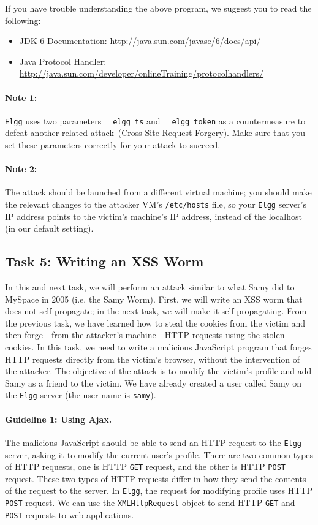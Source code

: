 If you have trouble understanding the above program, 
we suggest you to read the following:

\begin{itemize}
\item JDK 6 Documentation: \url{http://java.sun.com/javase/6/docs/api/}
\item Java Protocol Handler:\\ 
\url{http://java.sun.com/developer/onlineTraining/protocolhandlers/}
\end{itemize}

\paragraph{Note 1:} {\tt Elgg} uses two parameters {\tt \_\_elgg\_ts} and
{\tt \_\_elgg\_token} as a countermeasure to defeat another related 
attack~(Cross Site Request Forgery). Make sure that you set these 
parameters correctly for your attack to succeed.

\paragraph{Note 2:} The attack should be launched from a 
different virtual machine; you should make the relevant changes to the 
attacker VM's {\tt /etc/hosts} file, so your 
{\tt Elgg} server's IP address points to the victim's machine's IP address,
instead of the localhost (in our default setting).


\subsection{Task 5: Writing an XSS Worm}

In this and next task, we will perform an attack similar to what Samy did 
to MySpace in 2005 (i.e. the Samy Worm). First, we will write an XSS 
worm that does not self-propagate; in the next task, we will make it 
self-propagating.
From the previous task, we have learned how to steal the cookies from the victim 
and then forge---from the attacker's machine---HTTP requests using the stolen cookies.
In this task, we need to write a malicious JavaScript program that forges HTTP requests 
directly from the victim's browser, without the intervention of 
the attacker.  The objective of the attack is to modify the victim's 
profile and add Samy as a friend to the victim. We have already created a
user called Samy on the {\tt Elgg} server (the user name is {\tt samy}).


\paragraph{Guideline 1: Using Ajax.} The malicious JavaScript should be able to 
send an HTTP request to the {\tt Elgg} server, asking it to modify
the current user's profile. There are two common types of HTTP requests, 
one is HTTP {\tt GET} request,
and the other is HTTP {\tt POST} request. These two types of HTTP requests
differ in how they send the contents of the request to the server. 
In {\tt Elgg}, the request for modifying profile uses HTTP {\tt POST}
request. We can use the {\tt XMLHttpRequest} object to send 
HTTP {\tt GET} and {\tt POST} requests to web applications. 

